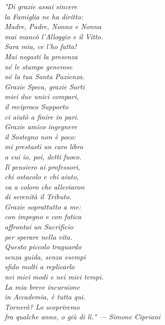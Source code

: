 \documentclass[12pt,a4paper]{scrbook}
\begin{document}
\frenchspacing
\raggedbottom
{}
\pagestyle{plain}

\pagestyle{scrheadings}
\tableofcontents
\listoffigures
\cleardoublepage
\thispagestyle{empty}
\begin{flushright}
\null{}
\emph{"Di grazie assai sincere\\ la Famiglia ne ha diritto:\\ Madre, Padre, Nonno e Nonna\\ mai mancò l'Alloggio e il Vitto.\\ \vspace{0.3cm} Sara mia, ce l'ho fatta!\\ Mai negasti la presenza\\ né le stampe generose\\ né la tua Santa Pazienza.\\ \vspace{0.3cm} Grazie Speca, grazie Sarti\\ miei due unici compari,\\ il reciproco Supporto\\ ci aiutò a finire in pari.\\ \vspace{0.3cm} Grazie amico ingegnere\\ il Sostegno non è poco:\\ mi prestasti un caro libro\\ a cui io, poi, detti fuoco.\\ \vspace{0.3cm} Il pensiero ai professori,\\ chi ostacolo e chi aiuto,\\ va a coloro che alleviaron\\ di serenità il Tributo.\\ \vspace{0.3cm} Grazie soprattutto a me:\\ con impegno e con fatica\\ affrontai un Sacrificio\\ per sperare nella vita.\\ \vspace{0.3cm} Questo piccolo traguardo\\ senza guida, senza esempi\\ sfido molti a replicarlo\\ nei miei modi e nei miei tempi.\\ \vspace{0.3cm} La mia breve incursione \\ in Accademia, è tutta qui.\\ Tornerò? Lo scopriremo\\ fra qualche anno, o giù di lì." \vspace{0.5cm} \break --- Simone Cipriani} \null
\end{flushright}
\end{document}
